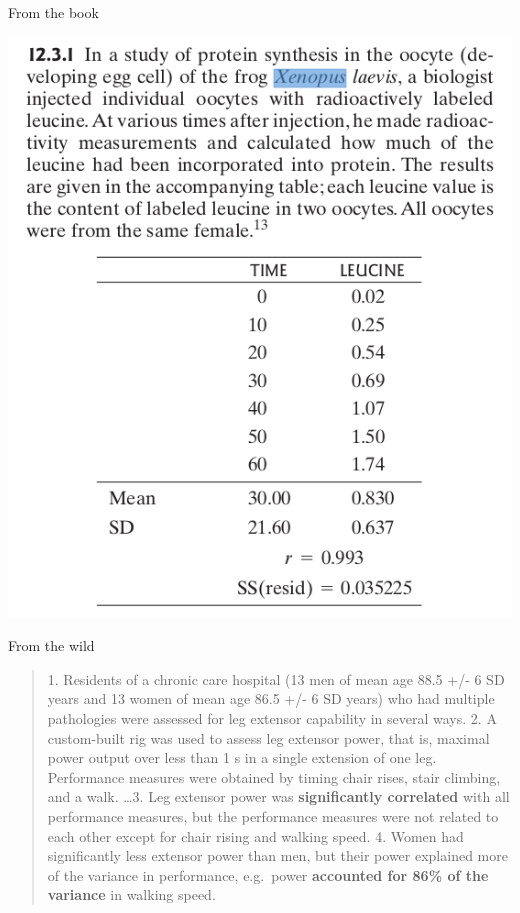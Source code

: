 \begin{frame}{From the book}

  \begin{center}
  \includegraphics[height=.8\textheight]{ex12-3-1.png}
  \end{center}

\end{frame}


\begin{frame}{From the wild}


  \begin{quote}
    1. Residents of a chronic care hospital (13 men of mean age 88.5 +/- 6 SD years and 13 women of mean age 86.5 +/- 6 SD years) who had multiple pathologies were assessed for leg extensor capability in several ways. 2. A custom-built rig was used to assess leg extensor power, that is, maximal power output over less than 1 s in a single extension of one leg. Performance measures were obtained by timing chair rises, stair climbing,  and a walk. \ldots 3. Leg extensor power was \textbf{significantly correlated} with all performance measures, but the performance measures were not related to each other except for chair rising and walking speed. 4. Women had significantly less extensor power than men, but their power explained more of the variance in performance, e.g.\ power \textbf{accounted for 86\% of the variance} in walking speed.
  \end{quote}

\end{frame}

